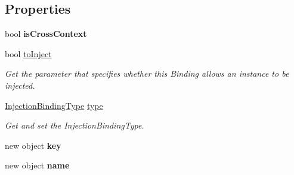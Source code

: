 \subsection*{Properties}
\begin{DoxyCompactItemize}
\item 
\hypertarget{interfacestrange_1_1extensions_1_1injector_1_1api_1_1_i_injection_binding_a964dae4babe47419ece25ce7df016401}{bool {\bfseries is\-Cross\-Context}}\label{interfacestrange_1_1extensions_1_1injector_1_1api_1_1_i_injection_binding_a964dae4babe47419ece25ce7df016401}

\item 
\hypertarget{interfacestrange_1_1extensions_1_1injector_1_1api_1_1_i_injection_binding_accffa605c37073081890281cc14d1c12}{bool \hyperlink{interfacestrange_1_1extensions_1_1injector_1_1api_1_1_i_injection_binding_accffa605c37073081890281cc14d1c12}{to\-Inject}}\label{interfacestrange_1_1extensions_1_1injector_1_1api_1_1_i_injection_binding_accffa605c37073081890281cc14d1c12}

\begin{DoxyCompactList}\small\item\em Get the parameter that specifies whether this Binding allows an instance to be injected. \end{DoxyCompactList}\item 
\hyperlink{namespacestrange_1_1extensions_1_1injector_1_1api_aaf5414484d7eccb5c502984bd70549ae}{Injection\-Binding\-Type} \hyperlink{interfacestrange_1_1extensions_1_1injector_1_1api_1_1_i_injection_binding_ab79532f96a6a17f831559143066fed78}{type}
\begin{DoxyCompactList}\small\item\em Get and set the Injection\-Binding\-Type. \end{DoxyCompactList}\item 
\hypertarget{interfacestrange_1_1extensions_1_1injector_1_1api_1_1_i_injection_binding_a01ff81e5c63698bd7e9614927dd05b8e}{new object {\bfseries key}}\label{interfacestrange_1_1extensions_1_1injector_1_1api_1_1_i_injection_binding_a01ff81e5c63698bd7e9614927dd05b8e}

\item 
\hypertarget{interfacestrange_1_1extensions_1_1injector_1_1api_1_1_i_injection_binding_ab66dc9cb77e7b5926a365f5e1baec1ae}{new object {\bfseries name}}\label{interfacestrange_1_1extensions_1_1injector_1_1api_1_1_i_injection_binding_ab66dc9cb77e7b5926a365f5e1baec1ae}


\end{DoxyCompactItemize}

